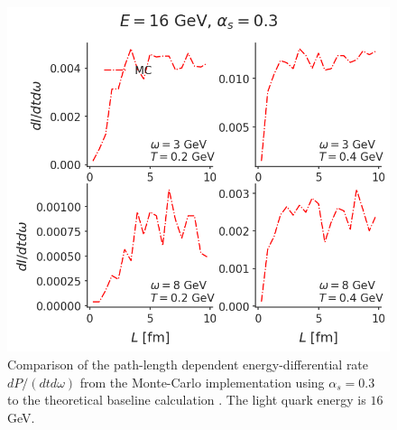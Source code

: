 \documentclass[aps, prc, reprint, amsmath, groupedaddress, nofootinbib]{revtex4-1}
\begin{document}
\begin{figure}
\includegraphics[width=\columnwidth]{spectrum_L.png}
\caption{Comparison of the path-length dependent energy-differential rate $dP/(dtd\omega)$ from the Monte-Carlo implementation using $\alpha_s = 0.3$ to the theoretical baseline calculation \cite{CaronHuot:2010bp}. The light quark energy is $16$ GeV.}
\label{fig:spectra-L-alphas=0.3}
\end{figure}
\end{document}

